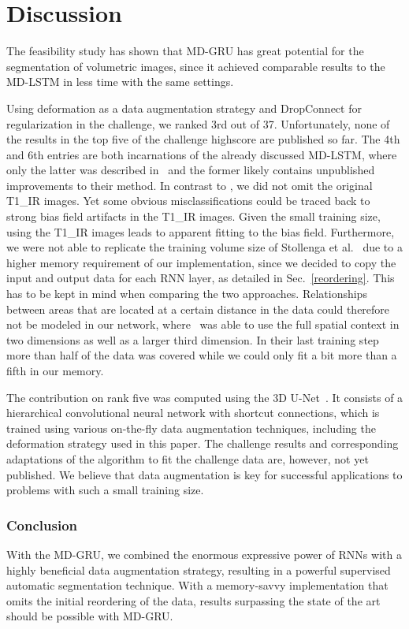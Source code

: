 \documentclass[runningheads,a4paper]{llncs}
\begin{document}
\section{Discussion}

The feasibility study has shown that MD-GRU has great potential for the segmentation of volumetric images, since it achieved comparable results to the MD-LSTM in less time with the same settings. 

Using deformation as a data augmentation strategy and DropConnect for regularization in the challenge, we ranked 3rd out of 37. Unfortunately, none of the results in the top five of the challenge highscore are published so far. The 4th and 6th entries are both incarnations of the already discussed MD-LSTM, where only the latter was described in~\cite{stollenga_parallel_2015} and the former likely contains unpublished improvements to their method. In contrast to \cite{stollenga_parallel_2015}, we did not omit the original T1\_IR images. Yet some obvious misclassifications could be traced back to strong bias field artifacts in the T1\_IR images. Given the small training size, using the T1\_IR images leads to apparent fitting to the bias field. Furthermore, we were not able to replicate the training volume size of Stollenga et al.~\cite{stollenga_parallel_2015} due to a higher memory requirement of our implementation, since we decided to copy the input and output data for each RNN layer, as detailed in Sec.~\ref{reordering}. This has to be kept in mind when comparing the two approaches. Relationships between areas that are located at a certain distance in the data could therefore not be modeled in our network, where~\cite{stollenga_parallel_2015} was able to use the full spatial context in two dimensions as well as a larger third dimension. In their last training step more than half of the data was covered while we could only fit a bit more than a fifth in our memory. 

The contribution on rank five was computed using the 3D U-Net~\cite{cicek_3d_2016}. It consists of a hierarchical convolutional neural network with shortcut connections, which is trained using various on-the-fly data augmentation techniques, including the deformation strategy used in this paper. The challenge results and corresponding adaptations of the algorithm to fit the challenge data are, however, not yet published. We believe that data augmentation is key for successful applications to problems with such a small training size. 


 \subsubsection{Conclusion}
 With the MD-GRU, we combined the enormous expressive power of RNNs with a highly beneficial data augmentation strategy, resulting in a powerful supervised automatic segmentation technique. With a memory-savvy implementation that omits the initial reordering of the data, results surpassing the state of the art should be possible with MD-GRU.





\end{document}
